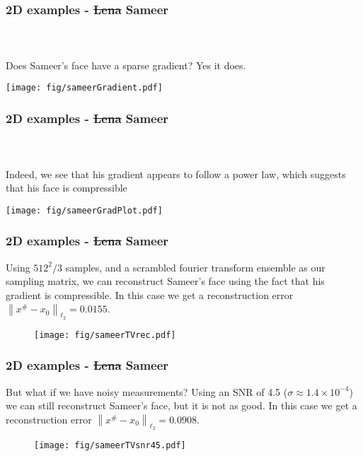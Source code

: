 \documentclass[mathserif,18pt,xcolor=table]{beamer}
\newcommand{\norm}[1]{\left\lVert #1 \right\rVert}
\begin{document}
\begin{frame}[t]
	\frametitle{2D examples - \st{Lena} Sameer}
\framesubtitle{~~}  %
 Does Sameer's face have a sparse gradient?
\pause
Yes it does.

\centering
\texttt{[image: fig/sameerGradient.pdf]}

\end{frame}


\begin{frame}[t]
	\frametitle{2D examples - \st{Lena} Sameer}
\framesubtitle{~~}  %

Indeed, we see that his gradient appears to follow a power law, which suggests that his face is compressible

\centering
\texttt{[image: fig/sameerGradPlot.pdf]}

\end{frame}


\begin{frame}[t]
	\frametitle{2D examples - \st{Lena} Sameer}

Using $512^2/3$ samples, and a scrambled fourier transform ensemble as our sampling matrix, we can reconstruct Sameer's
face using the fact that his gradient is compressible. In this case we get a reconstruction error $\norm{x^\# -x_0}_{\ell_2} = 0.0155$.
\begin{figure}
\centering
\texttt{[image: fig/sameerTVrec.pdf]}
\end{figure}


\end{frame}



\begin{frame}[t]
	\frametitle{2D examples - \st{Lena} Sameer}

	But what if we have noisy measurements? Using an SNR of 4.5 ($\sigma \approx 1.4\times10^{-4}$) we can still reconstruct
	Sameer's face, but it is not as good. In this case we get a reconstruction error $\norm{x^\# -x_0}_{\ell_2} = 0.0908$.
\pause

\begin{figure}
\centering
\texttt{[image: fig/sameerTVsnr45.pdf]}
\end{figure}



\end{frame}
\end{document}
